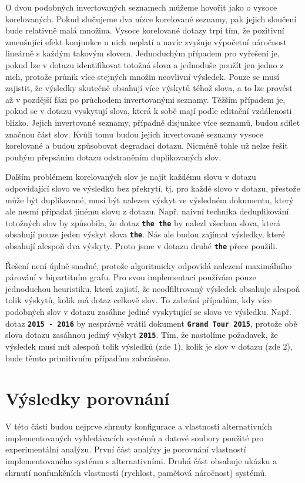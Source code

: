 \documentclass[11pt,letterpaper,oneside,openright]{book}
\newcommand{\bftt}[1]{\texttt{\textbf{#1}}}
\begin{document}
O dvou podobných invertovaných seznamech můžeme hovořit jako o vysoce
korelovaných. Pokud slučujeme dva nízce korelované seznamy, pak jejich sloučení
bude relativně malá množina. Vysoce korelované dotazy trpí tím, že pozitivní
zmenšující efekt konjunkce u nich neplatí a navíc zvyšuje výpočetní náročnost
lineárně s každým takovým slovem.  Jednoduchým případem pro vyřešení je, pokud
lze v dotazu identifikovat totožná slova a jednoduše použít jen jedno z nich,
protože průnik více stejných množin neovlivní výsledek. Pouze se musí zajistit,
že výsledky skutečně obsahují více výskytů téhož slova, a to lze provést až v
pozdější fázi po průchodem invertovanými seznamy.  Těžším případem je, pokud se
v dotazu vyskytují slova, která k sobě mají podle editační vzdálenosti blízko.
Jejich invertované seznamy, případně disjunkce více seznamů, budou sdílet
značnou část slov. Kvůli tomu budou jejich invertované seznamy vysoce
korelované a budou způsobovat degradaci dotazu.  Nicméně tohle už nelze řešit
pouhým přepsáním dotazu odstraněním duplikovaných slov.

Dalším problémem korelovaných slov je najít každému slovu v dotazu odpovídající
slovo ve výsledku bez překrytí, tj. pro každé slovo v dotazu, přestože může být
duplikované, musí být nalezen výskyt ve výsledném dokumentu, který ale nesmí
připadat jinému slovu z dotazu. Např. naivní technika deduplikování totožných
slov by způsobila, že dotaz \bftt{the the} by nalezl všechna slova, která
obsahují pouze jeden výskyt slova \bftt{the}. Nás ale budou zajímat výsledky,
které obsahují alespoň dva výskyty. Proto jsme v dotazu druhé \bftt{the} přece
použili.

Řešení není úplně snadné, protože algoritmicky odpovídá nalezení maximálního
párování v bipartitním grafu. Pro svou implementaci používám pouze jednoduchou
heuristiku, která zajistí, že neodfiltrovaný výsledek obsahuje alespoň tolik
výskytů, kolik má dotaz celkově slov. To zabrání případům, kdy více podobných
slov v dotazu zasáhne jediné vyskytující se slovo ve výsledku. Např. dotaz
\bftt{2015 - 2016} by nesprávně vrátil dokument \bftt{Grand Tour 2015}, protože
obě slova dotazu zasáhnou jediný výskyt \bftt{2015}. Tím, že nastolíme
požadavek, že výsledek musí mít alespoň tolik výsledků (zde 1), kolik je slov v
dotazu (zde 2), bude těmto primitivním případům zabráněno.




\chapter{Výsledky porovnání} \label{sec:results}
V této části budou nejprve shrnuty konfigurace a vlastnosti alternativních
implementovaných vyhledávacích systémů a datové soubory použité pro
experimentální analýzu.  První část analýzy je porovnání vlastností
implementovaného systému s alternativními. Druhá část obsahuje ukázku a shrnutí
nonfunkčních vlastností (rychlost, paměťová náročnost) systémů.
\end{document}
